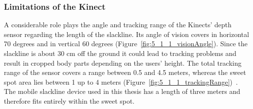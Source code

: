 \subsubsection{Limitations of the Kinect} 
A considerable role plays the angle and tracking range of the Kinects' depth sensor regarding the length of the slackline. Its angle of vision covers in horizontal 70 degrees and in vertical 60 degrees (Figure~\ref{fig:5_1_1_visionAngle}). Since the slackline is about 30 cm off the ground it could lead to tracking problems and result in cropped body parts depending on the users' height. The total tracking range of the sensor covers a range between 0.5 and 4.5 meters, whereas the sweet spot area lies between 1 up to 4 meters (Figure~\ref{fig:5_1_1_trackingRange})~\cite{MicrosoftHIG2014-mh}. The mobile slackline device used in this thesis has a length of three meters and therefore fits entirely within the sweet spot.
